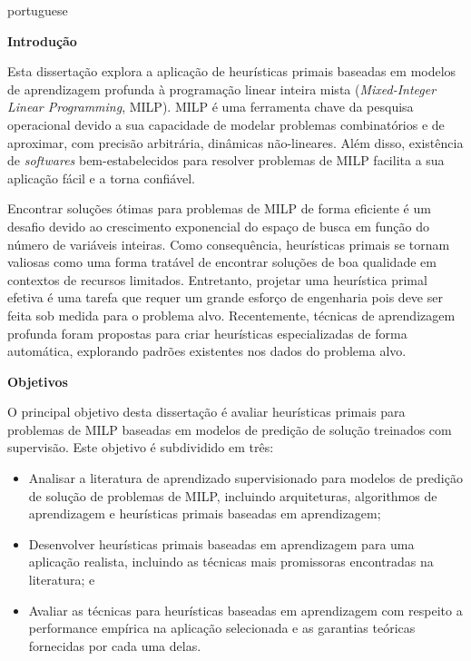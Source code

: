 \begin{resumo}
\begin{otherlanguage*}{portuguese}

\noindent\textbf{\large Introdução}\newline
{\noindent}

Esta dissertação explora a aplicação de heurísticas primais baseadas em modelos de aprendizagem profunda à programação linear inteira mista (\emph{Mixed-Integer Linear Programming}, MILP).
MILP é uma ferramenta chave da pesquisa operacional devido a sua capacidade de modelar problemas combinatórios e de aproximar, com precisão arbitrária, dinâmicas não-lineares.
Além disso, existência de \emph{softwares} bem-estabelecidos para resolver problemas de MILP facilita a sua aplicação fácil e a torna confiável.

Encontrar soluções ótimas para problemas de MILP de forma eficiente é um desafio devido ao crescimento exponencial do espaço de busca em função do número de variáveis inteiras.
Como consequência, heurísticas primais se tornam valiosas como uma forma tratável de encontrar soluções de boa qualidade em contextos de recursos limitados.
Entretanto, projetar uma heurística primal efetiva é uma tarefa que requer um grande esforço de engenharia pois deve ser feita sob medida para o problema alvo.
Recentemente, técnicas de aprendizagem profunda foram propostas para criar heurísticas especializadas de forma automática, explorando padrões existentes nos dados do problema alvo.


\noindent\textbf{\large Objetivos}\newline
{\noindent}

O principal objetivo desta dissertação é avaliar heurísticas primais para problemas de MILP baseadas em modelos de predição de solução treinados com supervisão.
Este objetivo é subdividido em três:
\begin{itemize}
    \item Analisar a literatura de aprendizado supervisionado para modelos de predição de solução de problemas de MILP, incluindo arquiteturas, algorithmos de aprendizagem e heurísticas primais baseadas em aprendizagem; 
    \item Desenvolver heurísticas primais baseadas em aprendizagem para uma aplicação realista, incluindo as técnicas mais promissoras encontradas na literatura; e
    \item Avaliar as técnicas para heurísticas baseadas em aprendizagem com respeito a performance empírica na aplicação selecionada e as garantias teóricas fornecidas por cada uma delas.
\end{itemize}


\end{otherlanguage*}
\end{resumo}

